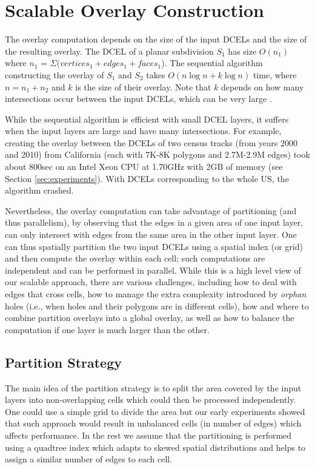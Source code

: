 \section{Scalable Overlay Construction} \label{sec:methods}

The overlay computation depends on the size of the input DCELs and the size of the resulting overlay.
The DCEL of a planar subdivision $S_1$ has size $O(n_1)$ where $n_1$ = $\Sigma (vertices_1 + edges_1 + faces_1$).
The sequential algorithm constructing the overlay of $S_1$ and $S_2$ takes $O(n \log n + k \log n)$ time, where $n = n_1 + n_2$ and $k$ is the size of their
overlay.
Note that $k$ depends on how many intersections occur between the input DCELs, which can be very large \cite{berg_computational_2008}. 

While the sequential algorithm is efficient with small DCEL layers, it suffers when the input layers are large and have many intersections. 
For example, creating the overlay between the DCELs of two census tracks (from years 2000 and 2010) from California (each with 7K-8K polygons and 2.7M-2.9M edges) took about 800sec on an Intel Xeon CPU at 1.70GHz  with 2GB of memory (see Section  \ref{sec:experiments}).
With DCELs corresponding to the whole US, the algorithm crashed. 

Nevertheless, the overlay computation can take advantage of partitioning (and thus parallelism), by observing that the edges in a given area of one input layer, can only intersect with edges from the same area in the other input layer. 
One can thus spatially partition the two input DCELs using a spatial index (or grid) and then compute the overlay within each cell; such computations are independent and can be performed in parallel. 
While this is a high level view of our scalable approach, there are various challenges, including how to deal with edges that cross cells, how to manage the extra complexity introduced by \textit{orphan} holes (i.e., when holes and their polygons are in different cells), how and where to combine partition overlays into a global overlay, as well as how to balance the computation if one layer is much larger than the other. 

\subsection{Partition Strategy} \label{sec:strategy}
The main idea of the partition strategy is to split the area covered by the input layers into non-overlapping cells which could then be processed independently.  
One could use a simple grid to divide the area but our early experiments showed that such approach would result in unbalanced cells (in number of edges) which affects performance. 
In the rest we assume that the partitioning is performed using a quadtree index which adapts to skewed spatial distributions and helps to assign a similar number of edges to each cell. 

